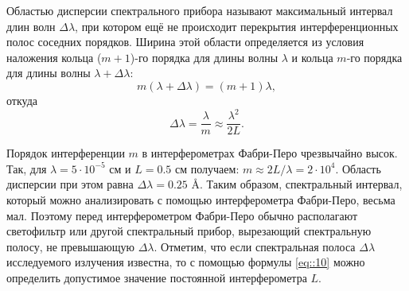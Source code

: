 Областью дисперсии спектрального прибора называют максимальный 
интервал длин волн $\Delta\lambda$, при котором ещё не происходит
перекрытия интерференционных полос соседних порядков. 
Ширина этой области определяется из условия наложения кольца
($m+1$)-го порядка для длины волны $\lambda$ и кольца $m$-го 
порядка для длины волны $\lambda+\Delta\lambda$:
$$
m\left(\lambda+\Delta\lambda\right)=\left(m+1\right)\lambda,
$$
\noindent откуда
\begin{equation}\label{eq::10}
  \Delta\lambda = \frac{\lambda}{m} \approx \frac{\lambda^{2}}{2L}.
\end{equation}

Порядок интерференции $m$ в интерферометрах Фабри-Перо чрезвычайно высок. Так, для 
$\lambda = 5 \cdot 10^{-5}$ см и $L = 0.5$ см получаем:
$m \approx 2 L / \lambda = 2 \cdot 10^4$. Область дисперсии при этом равна
$\Delta \lambda = 0.25$ \AA. Таким образом, спектральный интервал, который можно 
анализировать с помощью интерферометра Фабри-Перо, весьма мал. Поэтому перед
интерферометром Фабри-Перо обычно располагают светофильтр или другой
спектральный прибор, вырезающий спектральную полосу, не превышающую $\Delta \lambda$.
Отметим, что если спектральная полоса $\Delta \lambda$ исследуемого излучения
 известна, то с помощью формулы \eqref{eq::10} можно определить допустимое 
 значение постоянной интерферометра $L$.

\noindent 
